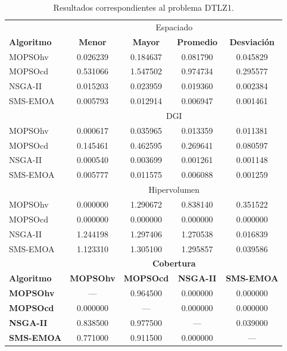 \newpage
\begin{table}
 \begin{center}
  \begin{tabular}{|l|cc|cc|} \hline
    & \multicolumn{4}{|c|}{Espaciado} \\ 
	\textbf{Algoritmo} & \textbf{Menor} & \textbf{Mayor} & \textbf{Promedio} & \textbf{Desviaci\'on} \\  \hline \hline
	MOPSOhv &0.026239 & 0.184637 & 0.081790 & 0.045829    \\ 
	MOPSOcd &0.531066 & 1.547502 & 0.974734 & 0.295577   \\ 
	NSGA-II &0.015203 & 0.023959 & 0.019360 & 0.002384   \\  
	SMS-EMOA&0.005793 & 0.012914 & 0.006947 & 0.001461   \\  
	\hline\hline
    & \multicolumn{4}{|c|}{DGI} \\ \hline\hline
	MOPSOhv &0.000617 & 0.035965 & 0.013359 & 0.011381  \\ 
	MOPSOcd &0.145461 & 0.462595 & 0.269641 & 0.080597  \\ 
	NSGA-II &0.000540 & 0.003699 & 0.001261 & 0.001148   \\  
	SMS-EMOA &0.005777 & 0.011575 & 0.006088 & 0.001259  \\  
	\hline\hline
    & \multicolumn{4}{|c|}{Hipervolumen} \\ 
  \hline\hline
	MOPSOhv &0.000000 & 1.290672 & 0.838140 & 0.351522  \\ 
	MOPSOcd &0.000000 & 0.000000 & 0.000000 & 0.000000  \\ 
	NSGA-II &1.244198 & 1.297406 & 1.270538 & 0.016839  \\  
	SMS-EMOA &1.123310 & 1.305100 & 1.295857 & 0.039586  \\  
	\hline\hline
	& \multicolumn{4}{|c|}{\textbf{Cobertura}} \\ \hline\hline 
	\textbf{Algoritmo} & \textbf{MOPSOhv} & \textbf{MOPSOcd} & \textbf{NSGA-II} & \textbf{SMS-EMOA} \\  \hline \hline
	\textbf{MOPSOhv} & ---      & 0.964500 & 0.000000 & 0.000000  \\ 
	\textbf{MOPSOcd} & 0.000000 & ---      &  0.000000  & 0.000000 \\ 
	\textbf{NSGA-II} & 0.838500 & 0.977500 & ---       & 0.039000 \\  
	\textbf{SMS-EMOA}& 0.771000 & 0.911500 & 0.000000  & --- \\  
	\hline
	\end{tabular}
\caption{Resultados correspondientes al problema DTLZ1.}
  \label{tab:dtlz1}
\end{center}
\end{table}

